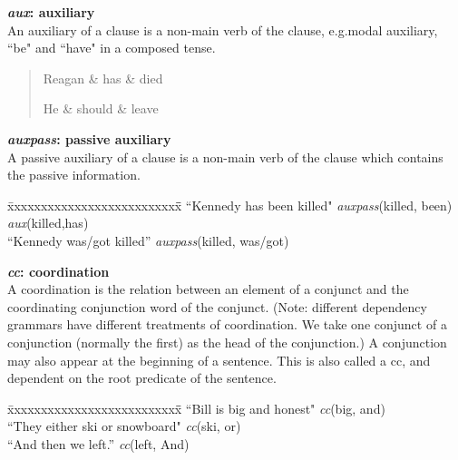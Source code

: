 \documentclass[11pt,letter]{article}
\begin{document}
\noindent \textbf{\emph{aux}: auxiliary}\\
An auxiliary of a clause is a non-main verb of the clause, e.g.\@ modal auxiliary, ``be" and ``have" in a composed tense.
\begin{quote}
\begin{dependency}
   \begin{deptext}[column sep=0.25cm]
      Reagan \& has \& died \\
   \end{deptext}
\end{dependency}
\hspace*{1in}
\begin{dependency}
   \begin{deptext}[column sep=0.25cm]
      He \& should \& leave \\
   \end{deptext}
\end{dependency}
\end{quote}

\noindent \textbf{\emph{auxpass}: passive auxiliary}\\
A passive auxiliary of a clause is a non-main verb of the clause which contains the passive information.
\begin{tabbing}
\hspace{1cm} \= xxxxxxxxxxxxxxxxxxxxxxxxxx\= \hspace{.5cm}\=  \kill
\> ``Kennedy has been killed"  \> \> \emph{auxpass}(killed, been)\\
\> \> \> \emph{aux}(killed,has)\\
\> ``Kennedy was/got killed'' \> \> \emph{auxpass}(killed, was/got)\\
\end{tabbing}

\noindent\textbf{\emph{cc}: coordination}\\
A coordination is the relation between an element of a conjunct and the coordinating conjunction word of the conjunct.  (Note: different dependency grammars have different treatments of coordination.  We take one conjunct of a conjunction (normally the first) as the head of the conjunction.)
A conjunction may also appear at the beginning of a sentence.  This is also called a cc, and dependent on the root predicate of the sentence.
\begin{tabbing}
\hspace{1cm} \= xxxxxxxxxxxxxxxxxxxxxxxxxx\= \hspace{.5cm}\=  \kill
\>  ``Bill is big and honest" \hspace{1cm} \> \> \emph{cc}(big, and)\\
\hspace{1cm} \> ``They either ski or snowboard" \> \> \emph{cc}(ski, or)\\
\> ``And then we left.'' \> \> \emph{cc}(left, And)\\
\end{tabbing}
\end{document}
